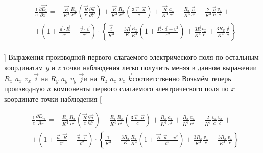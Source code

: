 \documentclass[11pt]{article}
\begin{document}
\begin{align}
  & \frac{1}{e}\frac{\partial \overrightarrow{{{E}_{1}}}}{\partial x}=-\frac{\overrightarrow{R}}{{{K}^{4}}}\frac{{{R}_{x}}}{{{c}^{2}}}\left( \frac{\overrightarrow{R}}{c}\frac{\partial \overrightarrow{a}}{\partial t'} \right)+\frac{\overrightarrow{R}}{{{K}^{4}}}\frac{{{R}_{x}}}{{{c}^{2}}}\left( \frac{3\ \overrightarrow{v}\cdot \overrightarrow{a}}{c} \right)+\frac{\overrightarrow{R}}{{{K}^{3}}}\frac{{{a}_{x}}}{{{c}^{2}}}+\frac{{{R}_{x}}}{{{K}^{3}}}\frac{\overrightarrow{a}}{{{c}^{2}}}-\frac{2}{{{K}^{3}}}\frac{\overrightarrow{v}}{c}\frac{{{v}_{x}}}{c}+ \\ 
 & +\left( 1+\frac{\overrightarrow{a}\cdot \overrightarrow{R}}{{{c}^{2}}}-\frac{\overrightarrow{v}\cdot \overrightarrow{v}}{{{c}^{2}}} \right)\cdot \left\{ \frac{\overrightarrow{i}}{{{K}^{3}}}-\frac{3\overrightarrow{R}}{K}\frac{{{R}_{x}}}{{{K}^{4}}}\left( 1+\frac{\overrightarrow{R}\cdot \overrightarrow{a}-{{v}^{2}}}{{{c}^{2}}} \right)+\frac{3\overrightarrow{R}}{{{K}^{4}}}\frac{{{v}_{x}}}{c}+\frac{3{{R}_{x}}}{{{K}^{4}}}\frac{\overrightarrow{v}}{c} \right\} \\ 
\end{align}

{]} Выражения производной первого слагаемого электрического поля по
остальным координатам \(y\) и \(z\) точки наблюдения легко получить
меняя в данном выражении \({{R}_{x}}\) \({{a}_{x}}\) \({{v}_{x}}\)
\(\overrightarrow{i}\) на \({{R}_{y}}\) \({{a}_{y}}\) \({{v}_{y}}\)
\(\overrightarrow{j}\)и на \({{R}_{z}}\) \({{a}_{z}}\) \({{v}_{z}}\)
\(\overrightarrow{k}\)соответственно Возьмём теперь производную \(x\)
компоненты первого слагаемого электрического поля по \(x\) координате
точки наблюдения {[}

\begin{align}
  & \frac{1}{e}\frac{\partial {{E}_{{{1}_{x}}}}}{\partial x}=-\frac{{{R}_{x}}}{{{K}^{4}}}\frac{{{R}_{x}}}{{{c}^{2}}}\left( \frac{\overrightarrow{R}}{c}\frac{\partial \overrightarrow{a}}{\partial t'} \right)+\frac{{{R}_{x}}}{{{K}^{4}}}\frac{{{R}_{x}}}{{{c}^{2}}}\left( \frac{3\ \overrightarrow{v}\cdot \overrightarrow{a}}{c} \right)+\frac{{{R}_{x}}}{{{K}^{3}}}\frac{{{a}_{x}}}{{{c}^{2}}}+\frac{{{R}_{x}}}{{{K}^{3}}}\frac{{{a}_{x}}}{{{c}^{2}}}-\frac{2}{{{K}^{3}}}\frac{{{v}_{x}}}{c}\frac{{{v}_{x}}}{c}+ \\ 
 & +\left( 1+\frac{\overrightarrow{a}\cdot \overrightarrow{R}}{{{c}^{2}}}-\frac{\overrightarrow{v}\cdot \overrightarrow{v}}{{{c}^{2}}} \right)\cdot \left\{ \frac{1}{{{K}^{3}}}-\frac{3{{R}_{x}}}{K}\frac{{{R}_{x}}}{{{K}^{4}}}\left( 1+\frac{\overrightarrow{R}\cdot \overrightarrow{a}-{{v}^{2}}}{{{c}^{2}}} \right)+\frac{3{{R}_{x}}}{{{K}^{4}}}\frac{{{v}_{x}}}{c}+\frac{3{{R}_{x}}}{{{K}^{4}}}\frac{{{v}_{x}}}{c} \right\} \\ 
\end{align}
\end{document}

